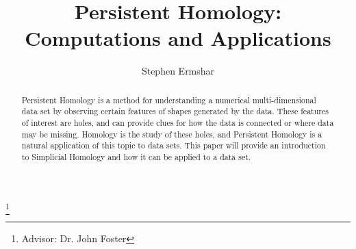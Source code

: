 

\title[Persistent Homology]{Persistent Homology: Computations and Applications}
\author{Stephen Ermshar}
\address{Walla Walla University}
\thanks{Advisor: Dr. John Foster}

\date{} %



\begin{abstract}
    Persistent Homology is a method for understanding a numerical multi-dimensional data set by observing certain features of shapes generated by the data. These features of interest are holes, and can provide clues for how the data is connected or where data may be missing. Homology is the study of these holes, and Persistent Homology is a natural application of this topic to data sets. This paper will provide an introduction to Simplicial Homology and how it can be applied to a data set.
\end{abstract}
\maketitle



%     




